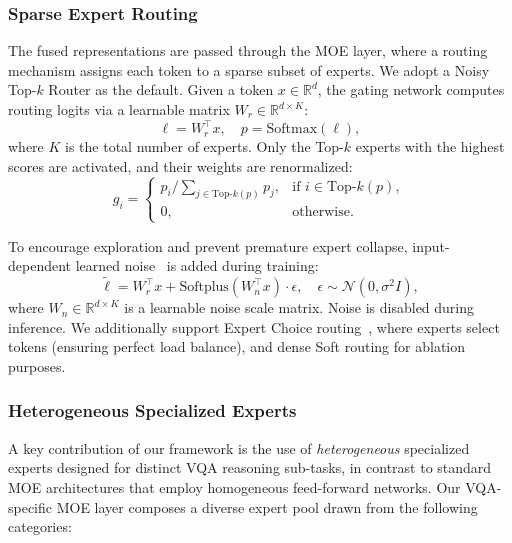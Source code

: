 \subsubsection{Sparse Expert Routing}
\label{sec:method:fusion:routing}

The fused representations are passed through the MOE layer, where a routing mechanism assigns each token to a sparse subset of experts. We adopt a Noisy Top-$k$ Router as the default. Given a token $x \in \mathbb{R}^d$, the gating network computes routing logits via a learnable matrix $W_r \in \mathbb{R}^{d \times K}$:
\begin{equation}
    \ell = W_r^\top x, \quad p = \text{Softmax}(\ell),
    \label{eq:routing}
\end{equation}
where $K$ is the total number of experts. Only the Top-$k$ experts with the highest scores are activated, and their weights are renormalized:
\begin{equation}
    g_i = 
    \begin{cases}
        p_i \big/ {\textstyle\sum_{j \in \text{Top-}k(p)} p_j}, & \text{if } i \in \text{Top-}k(p), \\
        0, & \text{otherwise}.
    \end{cases}
    \label{eq:topk_gate}
\end{equation}

To encourage exploration and prevent premature expert collapse, input-dependent learned noise~\cite{shazeer2017outrageously} is added during training:
\begin{equation}
    \tilde{\ell} = W_r^\top x + \text{Softplus}(W_n^\top x) \cdot \epsilon, \quad \epsilon \sim \mathcal{N}(0, \sigma^2 I),
    \label{eq:noisy_routing}
\end{equation}
where $W_n \in \mathbb{R}^{d \times K}$ is a learnable noise scale matrix. Noise is disabled during inference. We additionally support Expert Choice routing~\cite{zhou2022mixture}, where experts select tokens (ensuring perfect load balance), and dense Soft routing for ablation purposes.

\subsubsection{Heterogeneous Specialized Experts}
\label{sec:method:fusion:experts}

A key contribution of our framework is the use of \textit{heterogeneous} specialized experts designed for distinct VQA reasoning sub-tasks, in contrast to standard MOE architectures that employ homogeneous feed-forward networks. Our VQA-specific MOE layer composes a diverse expert pool drawn from the following categories:

